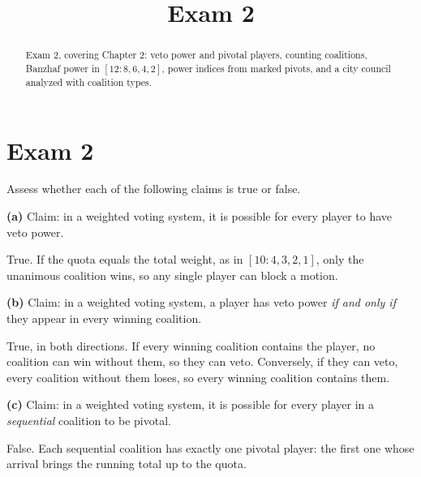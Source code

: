\documentclass[12pt]{ximera}
\title{Exam 2}
\begin{document}
\begin{abstract}
Exam 2, covering Chapter 2: veto power and pivotal players, counting coalitions,
Banzhaf power in $[12:8,6,4,2]$, power indices from marked pivots, and a city council
analyzed with coalition types.
\end{abstract}
\maketitle

\section*{Exam 2}

\begin{problem}
Assess whether each of the following claims is true or false.

\begin{prompt}
\textbf{(a)} Claim: in a weighted voting system, it is possible for every player to
have veto power.

\begin{multipleChoice}
\end{multipleChoice}

\begin{feedback}
True. If the quota equals the total weight, as in $[10:4,3,2,1]$, only the unanimous
coalition wins, so any single player can block a motion.
\end{feedback}
\end{prompt}

\begin{prompt}
\textbf{(b)} Claim: in a weighted voting system, a player has veto power \emph{if and only
if} they appear in every winning coalition.

\begin{multipleChoice}
\end{multipleChoice}

\begin{feedback}
True, in both directions. If every winning coalition contains the player, no coalition
can win without them, so they can veto. Conversely, if they can veto, every coalition
without them loses, so every winning coalition contains them.
\end{feedback}
\end{prompt}

\begin{prompt}
\textbf{(c)} Claim: in a weighted voting system, it is possible for every player in a
\emph{sequential} coalition to be pivotal.

\begin{multipleChoice}
\end{multipleChoice}

\begin{feedback}
False. Each sequential coalition has exactly one pivotal player: the first one whose
arrival brings the running total up to the quota.
\end{feedback}
\end{prompt}
\end{problem}
\end{document}
